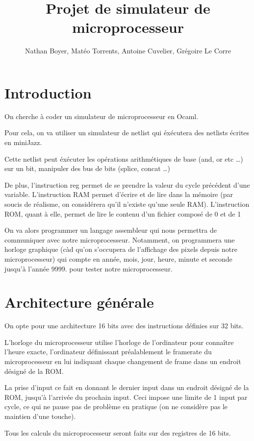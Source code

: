 \documentclass[12pt,a4paper,french]{article}
\title{Projet de simulateur de microprocesseur}
\author{Nathan Boyer, Matéo Torrents, Antoine Cuvelier, Grégoire Le Corre}
\begin{document}
\maketitle

\section*{Introduction}

On cherche à coder un simulateur de microprocesseur en Ocaml.

Pour cela, on va utiliser un simulateur de netlist qui éxécutera des netlists écrites en miniJazz.

Cette netlist peut éxécuter les opérations arithmétiques de base (and, or etc \ldots) sur un bit, manipuler des bus de bits (splice, concat \ldots)

De plus, l'instruction reg permet de se prendre la valeur du cycle précédent d'une variable. L'instruction RAM permet d'écrire et de lire dans la mémoire
(par soucis de réalisme, on considérera qu'il n'existe qu'une seule RAM). L'instruction ROM, quant à elle, permet de lire le contenu d'un fichier composé de 0 et de 1

On va alors programmer un langage assembleur qui nous permettra de communiquer avec notre microprocesseur. Notamment, on programmera une horloge graphique (càd qu'on s'occupera
de l'affichage des pixels depuis notre microprocesseur) qui compte en année, mois, jour, heure, minute et seconde jusqu'à l'année 9999.
pour tester notre microprocesseur.


\section{Architecture générale}

On opte pour une architecture 16 bits avec des instructions définies sur 32 bits.

L'horloge du microprocesseur utilise l'horloge de l'ordinateur pour connaître l'heure exacte, l'ordinateur définissant préalablement le framerate du microprocesseur en lui indiquant chaque changement de frame dans un endroit désigné de la ROM.

La prise d'input ce fait en donnant le dernier input dans un endroit désigné de la ROM, jusqu'à l'arrivée du prochain input. Ceci impose une limite de 1 input par cycle, ce qui ne pause pas de problème en pratique (on ne considère pas le maintien d'une touche).

Tous les calculs du microprocesseur seront faits sur des registres de 16 bits.
\end{document}
